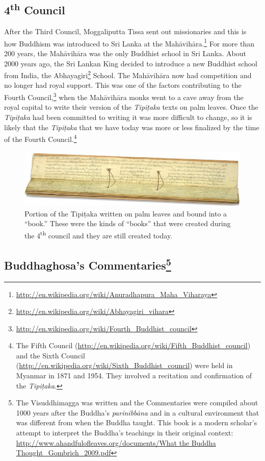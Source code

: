 \subsection*{4\textsuperscript{th} Council}

After the Third Council, Moggaliputta Tissa sent out missionaries and this is how Buddhism was introduced to Sri Lanka at the Mahāvihāra.\footnote{\url{http://en.wikipedia.org/wiki/Anuradhapura_Maha_Viharaya}} For more than 200 years, the Mahāvihāra was the only Buddhist school in Sri Lanka. About 2000 years ago, the Sri Lankan King decided to introduce a new Buddhist school from India, the Abhayagiri\footnote{\url{http://en.wikipedia.org/wiki/Abhayagiri_vihara}} School. The Mahāvihāra now had competition and no longer had royal support. This was one of the factors contributing to the Fourth Council,\footnote{\url{http://en.wikipedia.org/wiki/Fourth_Buddhist_council}} when the Mahāvihāra monks went to a cave away from the royal capital to write their version of the \textit{Tipiṭaka} texts on palm leaves. Once the \textit{Tipiṭaka} had been committed to writing it was more difficult to change, so it is likely that the \textit{Tipiṭaka} that we have today was more or less finalized by the time of the Fourth Council.\footnote{The Fifth Council (\url{http://en.wikipedia.org/wiki/Fifth_Buddhist_council}) and the Sixth Council (\url{http://en.wikipedia.org/wiki/Sixth_Buddhist_council}) were held in Myanmar in 1871 and 1954. They involved a recitation and confirmation of the \textit{Tipiṭaka}.}

\begin{figure}[h]
\centering
\includegraphics[width=1.0\linewidth]{./Diagrams/Palm}
\caption{Portion of the Tipiṭaka written on palm leaves and bound into a “book.” These were the kinds of “books” that were created during the 4\textsuperscript{th} council and they are still created today.}
\label{fig:Palm}
\end{figure}

\subsection*{Buddhaghosa’s Commentaries\footnote{The Visuddhimagga was written and the Commentaries were compiled about 1000 years after the Buddha’s \textit{parinibbāna} and in a cultural environment that was different from when the Buddha taught. This book is a modern scholar’s attempt to interpret the Buddha’s teachings in their original context: \url{http://www.ahandfulofleaves.org/documents/What the Buddha Thought_Gombrich_2009.pdf}}}


